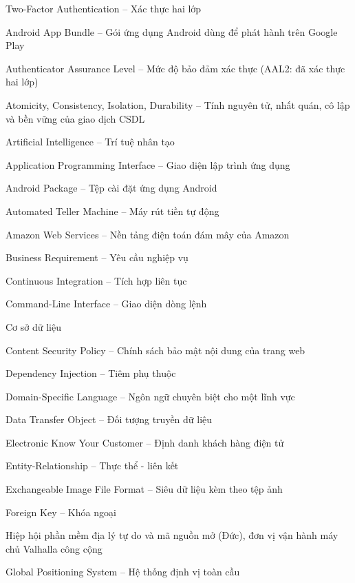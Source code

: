\begin{abbrv}
	\item[2FA] Two-Factor Authentication -- Xác thực hai lớp
	\item[AAB] Android App Bundle -- Gói ứng dụng Android dùng để phát hành trên Google Play
	\item[AAL] Authenticator Assurance Level -- Mức độ bảo đảm xác thực (AAL2: đã xác thực hai lớp)
	\item[ACID] Atomicity, Consistency, Isolation, Durability -- Tính nguyên tử, nhất quán, cô lập và bền vững của giao dịch CSDL
	\item[AI] Artificial Intelligence -- Trí tuệ nhân tạo
	\item[API] Application Programming Interface -- Giao diện lập trình ứng dụng
	\item[APK] Android Package -- Tệp cài đặt ứng dụng Android
	\item[ATM] Automated Teller Machine -- Máy rút tiền tự động
	\item[AWS] Amazon Web Services -- Nền tảng điện toán đám mây của Amazon
	\item[BR] Business Requirement -- Yêu cầu nghiệp vụ
	\item[CI] Continuous Integration -- Tích hợp liên tục
	\item[CLI] Command-Line Interface -- Giao diện dòng lệnh
	\item[CSDL] Cơ sở dữ liệu
	\item[CSP] Content Security Policy -- Chính sách bảo mật nội dung của trang web
	\item[DI] Dependency Injection -- Tiêm phụ thuộc
	\item[DSL] Domain-Specific Language -- Ngôn ngữ chuyên biệt cho một lĩnh vực
	\item[DTO] Data Transfer Object -- Đối tượng truyền dữ liệu
	\item[eKYC] Electronic Know Your Customer -- Định danh khách hàng điện tử
	\item[ER] Entity-Relationship -- Thực thể - liên kết
	\item[EXIF] Exchangeable Image File Format -- Siêu dữ liệu kèm theo tệp ảnh
	\item[FK] Foreign Key -- Khóa ngoại
	\item[FOSSGIS] Hiệp hội phần mềm địa lý tự do và mã nguồn mở (Đức), đơn vị vận hành máy chủ Valhalla công cộng
	\item[GPS] Global Positioning System -- Hệ thống định vị toàn cầu

\end{abbrv}
